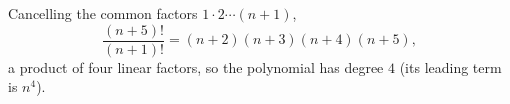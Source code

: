 Cancelling the common factors $1\cdot2\cdots(n+1)$,
\[
\dfrac{(n+5)!}{(n+1)!}=(n+2)(n+3)(n+4)(n+5),
\]
a product of four linear factors, so the polynomial has degree $\boxed{4}$ (its leading term is $n^4$).

